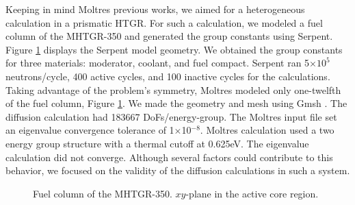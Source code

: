 Keeping in mind Moltres previous works, we aimed for a heterogeneous calculation in a prismatic \gls{HTGR}.
For such a calculation, we modeled a fuel column of the MHTGR-350 and generated the group constants using Serpent.
Figure \ref{fig:fuelcolumn} displays the Serpent model geometry.
We obtained the group constants for three materials: moderator, coolant, and fuel compact.
Serpent ran 5$\times 10^5$ neutrons/cycle, 400 active cycles, and 100 inactive cycles for the calculations.
Taking advantage of the problem's symmetry, Moltres modeled only one-twelfth of the fuel column, Figure \ref{fig:fuelcolumn}.
We made the geometry and mesh using Gmsh \cite{geuzaine_gmsh_2020}.
The diffusion calculation had 183667 \glspl{DoF}/energy-group.
The Moltres input file set an eigenvalue convergence tolerance of 1$\times$10$^{-8}$.
Moltres calculation used a two energy group structure with a thermal cutoff at 0.625eV.
The eigenvalue calculation did not converge.
Although several factors could contribute to this behavior, we focused on the validity of the diffusion calculations in such a system.


\begin{figure}[htbp!]
	\centering
	\hfill
    \caption{Fuel column of the MHTGR-350. $xy$-plane in the active core region.}
	\label{fig:fuelcolumn}
\end{figure}

